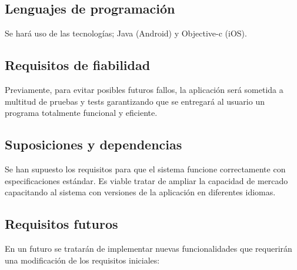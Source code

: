     \subsection{Lenguajes de programación}
        Se hará uso de las tecnologías; Java (Android) y Objective-c (iOS).

    \subsection{Requisitos de fiabilidad}
        Previamente, para evitar posibles futuros fallos, la aplicación será sometida a multitud de pruebas y tests garantizando que se entregará al usuario un programa totalmente funcional y eficiente.

    \subsection{Suposiciones y dependencias}
        Se han supuesto los requisitos para que el sistema funcione correctamente con especificaciones estándar.
        Es viable tratar de ampliar la capacidad de mercado capacitando al sistema con versiones de la aplicación en diferentes idiomas.

    \subsection{Requisitos futuros}
        En un futuro se tratarán de implementar nuevas funcionalidades que requerirán una modificación de los requisitos iniciales:
